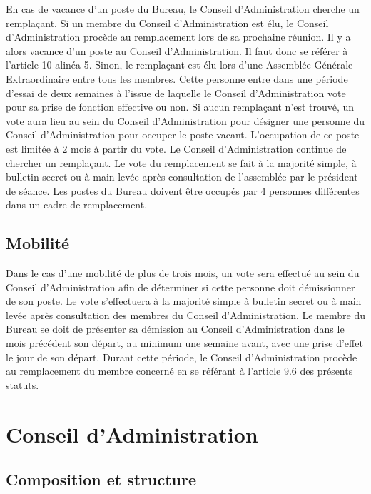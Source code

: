 \documentclass[12pt]{article}
\begin{document}
En cas de vacance d’un poste du Bureau, le Conseil d’Administration cherche un remplaçant.
Si un membre du Conseil d’Administration est élu, le Conseil d’Administration procède au remplacement
lors de sa prochaine réunion. Il y a alors vacance d’un poste au Conseil d’Administration. Il faut donc se
référer à l’article 10 alinéa 5.
Sinon, le remplaçant est élu lors d’une Assemblée Générale Extraordinaire entre tous les membres. Cette
personne entre dans une période d'essai de deux semaines à l'issue de laquelle le Conseil d’Administration
vote pour sa prise de fonction effective ou non.
Si aucun remplaçant n’est trouvé, un vote aura lieu au sein du Conseil d’Administration pour désigner une
personne du Conseil d’Administration pour occuper le poste vacant. L’occupation de ce poste est limitée à 2
mois à partir du vote.
Le Conseil d’Administration continue de chercher un remplaçant.
Le vote du remplacement se fait à la majorité simple, à bulletin secret ou à main levée après consultation de
l'assemblée par le président de séance.
Les postes du Bureau doivent être occupés par 4 personnes différentes dans un cadre de remplacement.


\subsection{Mobilité}
\label{sec:bureau:mobilite}

Dans le cas d’une mobilité de plus de trois mois, un vote sera effectué au sein du Conseil d’Administration afin
de déterminer si cette personne doit démissionner de son poste. Le vote s’effectuera à la majorité simple à
bulletin secret ou à main levée après consultation des membres du Conseil d’Administration. Le membre du
Bureau se doit de présenter sa démission au Conseil d’Administration dans le mois précédent son départ, au
minimum une semaine avant, avec une prise d’effet le jour de son départ.
Durant cette période, le Conseil d’Administration procède au remplacement du membre concerné en se
référant à l’article 9.6 des présents statuts.


\section{Conseil d’Administration}
\label{sec:conseil}

\subsection{Composition et structure}
\label{sec:conseil:composition}
\end{document}
